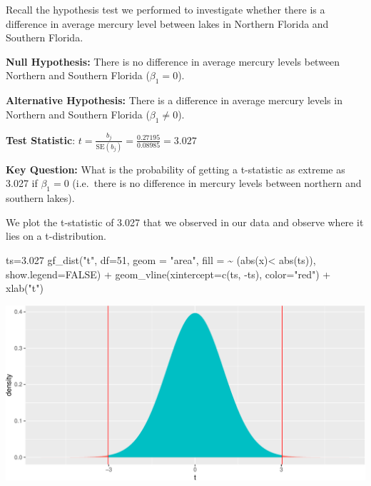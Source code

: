 \documentclass[
  letterpaper,
  DIV=11,
  numbers=noendperiod]{scrreprt}
\newenvironment{Shaded}{\begin{snugshade}}{\end{snugshade}}
\newcommand{\AttributeTok}[1]{\textcolor[rgb]{0.40,0.45,0.13}{#1}}
\newcommand{\ConstantTok}[1]{\textcolor[rgb]{0.56,0.35,0.01}{#1}}
\newcommand{\DecValTok}[1]{\textcolor[rgb]{0.68,0.00,0.00}{#1}}
\newcommand{\FloatTok}[1]{\textcolor[rgb]{0.68,0.00,0.00}{#1}}
\newcommand{\FunctionTok}[1]{\textcolor[rgb]{0.28,0.35,0.67}{#1}}
\newcommand{\NormalTok}[1]{\textcolor[rgb]{0.00,0.23,0.31}{#1}}
\newcommand{\OtherTok}[1]{\textcolor[rgb]{0.00,0.23,0.31}{#1}}
\newcommand{\SpecialCharTok}[1]{\textcolor[rgb]{0.37,0.37,0.37}{#1}}
\newcommand{\StringTok}[1]{\textcolor[rgb]{0.13,0.47,0.30}{#1}}
\begin{document}
Recall the hypothesis test we performed to investigate whether there is
a difference in average mercury level between lakes in Northern Florida
and Southern Florida.

\textbf{Null Hypothesis:} There is no difference in average mercury
levels between Northern and Southern Florida (\(\beta_1=0\)).

\textbf{Alternative Hypothesis:} There is a difference in average
mercury levels in Northern and Southern Florida (\(\beta_1\neq 0\)).

\textbf{Test Statistic}:
\(t=\frac{{b_j}}{\text{SE}(b_j)} = \frac{0.27195}{0.08985} = 3.027\)

\textbf{Key Question:} What is the probability of getting a t-statistic
as extreme as 3.027 if \(\beta_1=0\) (i.e.~there is no difference in
mercury levels between northern and southern lakes).

We plot the t-statistic of 3.027 that we observed in our data and
observe where it lies on a t-distribution.

\begin{Shaded}
\begin{Highlighting}[]
\NormalTok{ts}\OtherTok{=}\FloatTok{3.027}
\FunctionTok{gf\_dist}\NormalTok{(}\StringTok{"t"}\NormalTok{, }\AttributeTok{df=}\DecValTok{51}\NormalTok{, }\AttributeTok{geom =} \StringTok{"area"}\NormalTok{, }\AttributeTok{fill =} \SpecialCharTok{\textasciitilde{}}\NormalTok{ (}\FunctionTok{abs}\NormalTok{(x)}\SpecialCharTok{\textless{}} \FunctionTok{abs}\NormalTok{(ts)), }\AttributeTok{show.legend=}\ConstantTok{FALSE}\NormalTok{) }\SpecialCharTok{+} \FunctionTok{geom\_vline}\NormalTok{(}\AttributeTok{xintercept=}\FunctionTok{c}\NormalTok{(ts, }\SpecialCharTok{{-}}\NormalTok{ts), }\AttributeTok{color=}\StringTok{"red"}\NormalTok{)  }\SpecialCharTok{+} \FunctionTok{xlab}\NormalTok{(}\StringTok{"t"}\NormalTok{)}
\end{Highlighting}
\end{Shaded}

\includegraphics{Ch4_files/figure-pdf/unnamed-chunk-59-1.pdf}
\end{document}
